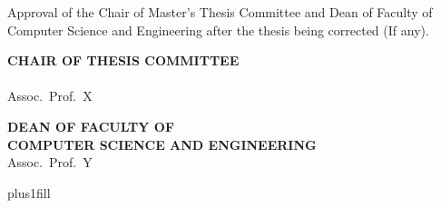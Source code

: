 \documentclass[a4paper,oneside]{book}
\begin{document}
\begin{titlepage}
\begin{flushleft}
        \vspace{0.1cm}

        {{\fontsize{12}{1} Approval of the Chair of Master's Thesis Committee and Dean of Faculty of Computer Science and Engineering after the thesis being corrected (If any).}}
    \end{flushleft}

    \vspace{0.1cm}

    \begin{minipage}[t]{0.45\textwidth}
        \begin{flushleft}
            {\fontsize{8pt}{1}\textbf{CHAIR OF THESIS COMMITTEE}}\\[0.1cm]
            {\fontsize{8pt}{1}\textbf{}}\\[1cm]
            {\fontsize{8pt}{1} Assoc.\ Prof.\ X}
        \end{flushleft}
    \end{minipage}
    \begin{minipage}[t]{0.55\textwidth}
        \begin{flushleft}
            {\fontsize{8pt}{1}\textbf{DEAN OF FACULTY OF}}\\[0.1cm]
            {\fontsize{8pt}{1}\textbf{COMPUTER SCIENCE AND ENGINEERING}}\\[1cm]
            {\fontsize{8pt}{1} Assoc.\ Prof.\ Y}
        \end{flushleft}
    \end{minipage}

    \vskip0pt plus1fill
\end{titlepage}
\end{document}
